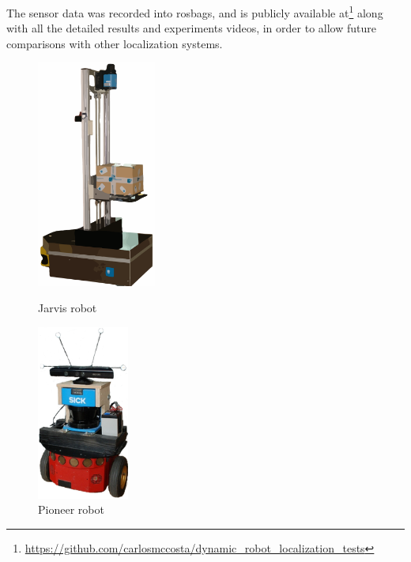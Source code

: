 \documentclass[9pt,a4paper]{extarticle}
\begin{document}
\begin{multicols}{2}
The sensor data was recorded into rosbags, and is publicly available at\footnote{\url{https://github.com/carlosmccosta/dynamic_robot_localization_tests}} along with all the detailed results and experiments videos, in order to allow future comparisons with other localization systems.

\begin{figure}[H]
	\centering
	\begin{minipage}[b]{0.23\textwidth}
		\centering
		\includegraphics[width=0.35\textwidth]{jarvis}
		\caption{\small Jarvis robot}
		\label{fig:jarvis}
	\end{minipage}\hfill
	\begin{minipage}[b]{0.23\textwidth}
		\centering
		\includegraphics[width=0.27\textwidth]{pioneer-3dx}
		\caption{\small Pioneer robot \cite{Sturm2012}}
		\label{fig:pioneer}
	\end{minipage}
\end{figure}


\end{multicols}
\end{document}

